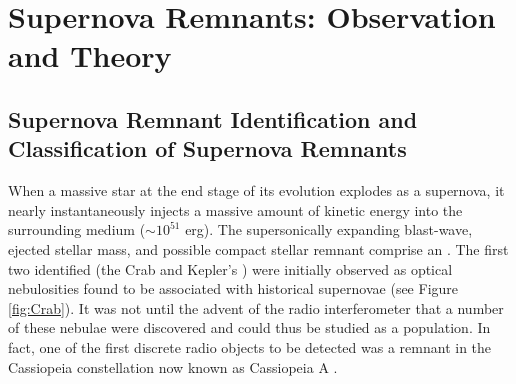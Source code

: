 \chapter{Supernova Remnants: Observation and Theory}
\label{chap:Rems}

\section{Supernova Remnant Identification and Classification of Supernova Remnants}\label{Rems:intro}
When a massive star at the end stage of its evolution explodes as a supernova, it nearly instantaneously injects a massive amount of kinetic energy into the surrounding medium ($\sim 10^{51}$ erg). The supersonically expanding blast-wave, ejected stellar mass, and possible compact stellar remnant comprise an \snr{}. The first two identified \snrs{} (the Crab and Kepler's \snr{}) were initially observed as optical nebulosities found to be associated with historical supernovae (see Figure \ref{fig:Crab}). It was not until the advent of the radio interferometer that a number of these nebulae were discovered and could thus be studied as a population.  In fact, one of the first discrete radio objects to be detected was a remnant in the Cassiopeia constellation now known as Cassiopeia A \citep{Ryle48}.

